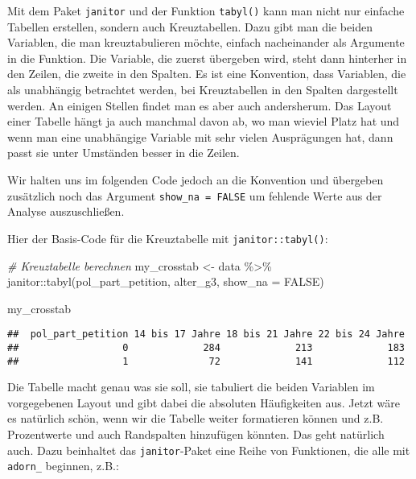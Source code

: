 \documentclass[
]{book}
\newenvironment{Shaded}{\begin{snugshade}}{\end{snugshade}}
\newcommand{\AttributeTok}[1]{\textcolor[rgb]{0.77,0.63,0.00}{#1}}
\newcommand{\CommentTok}[1]{\textcolor[rgb]{0.56,0.35,0.01}{\textit{#1}}}
\newcommand{\ConstantTok}[1]{\textcolor[rgb]{0.00,0.00,0.00}{#1}}
\newcommand{\FunctionTok}[1]{\textcolor[rgb]{0.00,0.00,0.00}{#1}}
\newcommand{\NormalTok}[1]{#1}
\newcommand{\OtherTok}[1]{\textcolor[rgb]{0.56,0.35,0.01}{#1}}
\newcommand{\SpecialCharTok}[1]{\textcolor[rgb]{0.00,0.00,0.00}{#1}}
\begin{document}
Mit dem Paket \texttt{janitor} und der Funktion \texttt{tabyl()} kann man nicht nur einfache Tabellen erstellen, sondern auch Kreuztabellen. Dazu gibt man die beiden Variablen, die man kreuztabulieren möchte, einfach nacheinander als Argumente in die Funktion. Die Variable, die zuerst übergeben wird, steht dann hinterher in den Zeilen, die zweite in den Spalten. Es ist eine Konvention, dass Variablen, die als unabhängig betrachtet werden, bei Kreuztabellen in den Spalten dargestellt werden. An einigen Stellen findet man es aber auch andersherum. Das Layout einer Tabelle hängt ja auch manchmal davon ab, wo man wieviel Platz hat und wenn man eine unabhängige Variable mit sehr vielen Ausprägungen hat, dann passt sie unter Umständen besser in die Zeilen.

Wir halten uns im folgenden Code jedoch an die Konvention und übergeben zusätzlich noch das Argument \texttt{show\_na\ =\ FALSE} um fehlende Werte aus der Analyse auszuschließen.

Hier der Basis-Code für die Kreuztabelle mit \texttt{janitor::tabyl()}:

\begin{Shaded}
\begin{Highlighting}[]
\CommentTok{\# Kreuztabelle berechnen}
\NormalTok{my\_crosstab }\OtherTok{\textless{}{-}}\NormalTok{ data }\SpecialCharTok{\%\textgreater{}\%}
\NormalTok{  janitor}\SpecialCharTok{::}\FunctionTok{tabyl}\NormalTok{(pol\_part\_petition, alter\_g3, }\AttributeTok{show\_na =} \ConstantTok{FALSE}\NormalTok{) }

\NormalTok{my\_crosstab}
\end{Highlighting}
\end{Shaded}

\begin{verbatim}
##  pol_part_petition 14 bis 17 Jahre 18 bis 21 Jahre 22 bis 24 Jahre
##                  0             284             213             183
##                  1              72             141             112
\end{verbatim}

Die Tabelle macht genau was sie soll, sie tabuliert die beiden Variablen im vorgegebenen Layout und gibt dabei die absoluten Häufigkeiten aus. Jetzt wäre es natürlich schön, wenn wir die Tabelle weiter formatieren können und z.B. Prozentwerte und auch Randspalten hinzufügen könnten. Das geht natürlich auch. Dazu beinhaltet das \texttt{janitor}-Paket eine Reihe von Funktionen, die alle mit \texttt{adorn\_} beginnen, z.B.:
\end{document}
